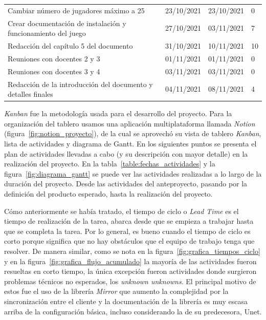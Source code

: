 \begin{longtable}[c]{m{} m{} m{} m{}}
        Cambiar número de jugadores máximo a 25 & 23/10/2021 & 23/10/2021 & 0 \\  
        Crear documentación de instalación y funcionamiento del juego & 27/10/2021 & 03/11/2021 & 7 \\  
        Redacción del capítulo 5 del documento & 31/10/2021 & 10/11/2021 & 10 \\  
        Reuniones con docentes 2 y 3 & 01/11/2021 & 01/11/2021 & 0 \\  
        Reuniones con docentes 3 y 4 & 03/11/2021 & 03/11/2021 & 0 \\  
        Redacción de la introducción del documento y detalles finales & 04/11/2021 & 08/11/2021 & 4 \\  
\end{longtable}

\textit{Kanban} fue la metodología usada para el desarrollo del proyecto. Para la organización del tablero usamos una aplicación multiplataforma llamada  \textit{Notion} (figura~\ref{fig:notion_proyecto}), de la cual se aprovechó su vista de tablero \textit{Kanban}, lista de actividades y diagrama de Gantt. En los siguientes puntos se presenta el plan de actividades llevadas a cabo (y su descripción con mayor detalle) en la realización del proyecto. En la tabla~\ref{table:fechas_actividades} y la figura~\ref{fig:diagrama_gantt} se puede ver las actividades realizadas a lo largo de la duración del proyecto. Desde las actividades del anteproyecto, pasando por la definición del producto esperado, hasta la realización del proyecto. 

Cómo anteriormente se había tratado, el tiempo de ciclo o \textit{Lead Time} es el tiempo de realización de la tarea, abarca desde que se empieza a trabajar hasta que se completa la tarea. Por lo general, es bueno cuando el tiempo de ciclo es corto porque significa que no hay obstáculos que el equipo de trabajo tenga que resolver. De manera similar, como se nota en la figura~\ref{fig:grafica_tiempos_ciclo} y en la figura~\ref{fig:grafica_flujo_acumulado} la mayoría de las actividades fueron resueltas en corto tiempo, la única excepción fueron actividades donde surgieron problemas técnicos no esperados, los \textit{unknown unknowns}. El principal motivo de estos fue el uso de la librería \textit{Mirror} que aumento la complejidad por la sincronización entre el cliente y la documentación de la librería es muy escasa arriba de la configuración básica, incluso considerando la de su predecesora, Unet.

